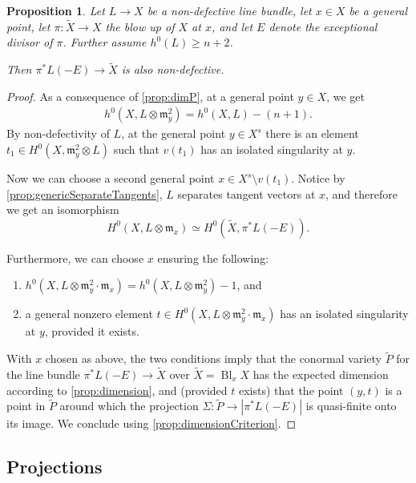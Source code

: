 \documentclass[11pt,reqno]{amsart}
\theoremstyle{plain}
\newtheorem{proposition}[theorem]{Proposition}
\theoremstyle{definition}
\theoremstyle{remark}
\numberwithin{equation}{section}
\DeclareMathOperator{\Bl}{Bl}
\renewcommand{\to}{{\longrightarrow}}
\numberwithin{equation}{section}
\begin{document}
\begin{proposition}
  \label{prop:blowuppoint}
  Let $L \to X$ be a non-defective line bundle, let $x \in X$ be a general point, let $\pi : \widetilde{X} \to X$ the blow up of $X$ at $x$, and let $E$ denote the exceptional divisor of $\pi$. Further assume $h^{0}(L) \geq n+2$. 

  Then $\pi^{*}L (-E) \to \widetilde{X}$ is also non-defective. 
\end{proposition}

\begin{proof}
 As a consequence of \autoref{prop:dimP}, at a general point $y \in X$, we get
  \begin{align*}
    h^{0}(X,  L \otimes {\mathfrak{m}^{2}_{y}}) = h^{0}(X,L) - (n+1).
  \end{align*}
By non-defectivity of $L$, at the general point $y \in X^{s}$ there is an element $t_{1} \in H^{0}(X, {\mathfrak{m}^{2}_{y}} \otimes L)$ such that $v(t_{1})$ has an isolated singularity at $y$.

Now we can choose a second general point $x \in X^{s} \setminus v(t_{1})$. 
Notice  by \autoref{prop:genericSeparateTangents}, $L$ separates
tangent vectors at  $x$, and therefore we get an isomorphism
$$H^{0}(X, L \otimes {\mathfrak m}_{x}) \simeq H^{0}(\widetilde{X},
\pi^{*}L(-E)).$$
 

Furthermore, we can choose $x$ ensuring the following: 
\begin{enumerate}
  \item  $h^{0}(X,  L \otimes {\mathfrak m}^{2}_{y}\cdot {\mathfrak m}_{x}) = h^{0}(X,  L \otimes {\mathfrak{m}^{2}_{y}}) - 1$, and
  \item a general nonzero element $t \in  H^{0}(X, L \otimes{\mathfrak m}^{2}_{y}\cdot {\mathfrak m}_{x})$ has an isolated singularity at $y$, provided it exists.
 \end{enumerate}

 With $x$ chosen as above, the two conditions imply that the conormal variety
 $\widetilde{P}$ for the line bundle $\pi^{*}L(-E) \to {\widetilde{X}}$ over
 $\widetilde{X} = \Bl_{x}X$ has the expected dimension according to \autoref{prop:dimension}, and (provided $t$ exists) that the point $(y,t)$ is a point in $\widetilde{P}$ around which the projection $\Sigma: \widetilde{P} \to |\pi^{*}L(-E)|$ is quasi-finite onto its image. We conclude using \autoref{prop:dimensionCriterion}.
\end{proof}

\subsection{Projections}
\end{document}
